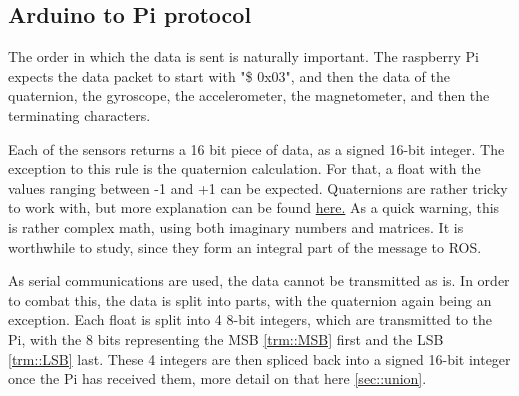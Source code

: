 \subsection{Arduino to Pi protocol}
The order in which the data is sent is naturally important.
The raspberry Pi expects the data packet to start with "\$ 0x03", and then the data of the quaternion, the gyroscope, the accelerometer, the magnetometer, and then the terminating characters. 

Each of the sensors returns a 16 bit piece of data, as a signed 16-bit integer.
The exception to this rule is the quaternion calculation.
For that, a float with the values ranging between -1 and +1 can be expected.
Quaternions are rather tricky to work with, but more explanation can be found \href{https://www.3dgep.com/understanding-quaternions/#The_Complex_Plane}{here.}
As a quick warning, this is rather complex math, using both imaginary numbers and matrices.
It is worthwhile to study, since they form an integral part of the message to ROS.

As serial communications are used, the data cannot be transmitted as is.
In order to combat this, the data is split into parts, with the quaternion again being an exception.
Each float is split into 4 8-bit integers, which are transmitted to the Pi, with the 8 bits representing the MSB \ref{trm::MSB} first and the LSB \ref{trm::LSB} last.
These 4 integers are then spliced back into a signed 16-bit integer once the Pi has received them, more detail on that here \ref{sec::union}.


